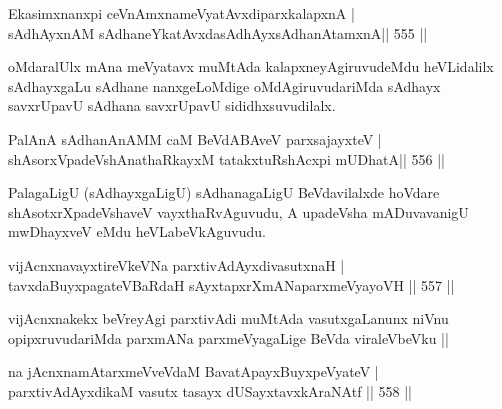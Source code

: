 
\begin{shl}
Ekasimxnanxpi ceVnAmxnameVyatAvx\footnotemark[1]diparxkalapxnA | \\
sAdhAyxnAM sAdhaneYkatAvxdasAdhAyxsAdhanAtamxnA\hfill ||  555 ||  
\end{shl}

\begin{artha}
oMdaralUlx mAna meVyatavx muMtAda kalapxneyAgiruvudeMdu heVLidalilx sAdhayxgaLu sAdhane nanxgeLoMdige oMdAgiruvudariMda sAdhayx savxrUpavU sAdhana savxrUpavU sididhxsuvudilalx.
\end{artha}


\begin{shl}
PalAnA sAdhanAnAMM caM BeVdABAveV parxsajayxteV | \\
shAsorxVpadeVshAnathaRkayxM tatakxtuRshAcxpi mUDhatA\hfill ||  556 ||  
\end{shl}

\begin{artha}
PalagaLigU (sAdhayxgaLigU) sAdhanagaLigU BeVdavilalxde hoVdare shAsotxrXpadeVshaveV vayxthaRvAguvudu, A upadeVsha mADuvavanigU mwDhayxveV eMdu heVLabeVkAguvudu.
\end{artha}


\begin{shl}
vijAcnxnavayxtireVkeVNa parxtivAdAyxdivasutxnaH | \\
tavxdaBuyxpagateVBaRdaH sAyxtapxrXmANaparxmeVyayoVH \hfill||  557 || 
\end{shl}

\begin{artha}
vijAcnxnakekx beVreyAgi parxtivAdi muMtAda vasutxgaLanunx niVnu opipxruvudariMda parxmANa parxmeVyagaLige BeVda viraleVbeVku || 
\end{artha}


\begin{shl}
na jAcnxnamAtarxmeVveVdaM BavatA\s payxBuyxpeVyateV | \\
parxtivAdAyxdikaM vasutx tasayx dUSayxtavxkAraNAtf \hfill||  558 ||  
\end{shl}


